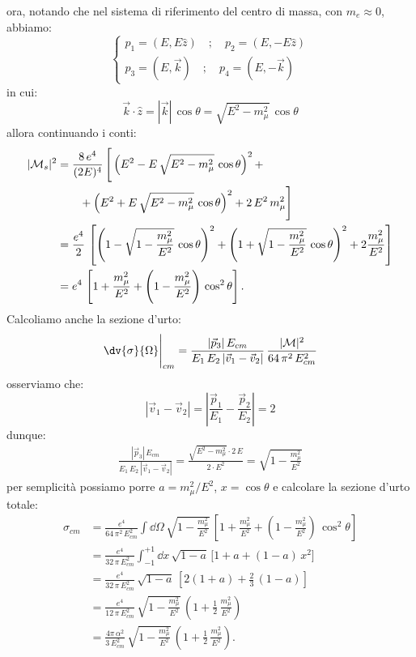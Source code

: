 ora, notando che nel sistema di riferimento del centro di massa, con $m_e\approx 0$, abbiamo:
\begin{equation}
    \begin{cases}
        p_1 = (E,E\hat{z}) \quad ; \quad p_2 = (E,-E\hat{z}) \\
        p_3 = (E,\vec{k}) \quad ; \quad p_4 = (E,-\vec{k})
    \end{cases}
\end{equation}
in cui:
\begin{equation}
    \vec{k}\cdot\hat{z} = |\vec{k}|\, \cos\theta = \sqrt{E^2 - m_\mu^2}\, \cos\theta
\end{equation}
allora continuando i conti:
\begin{align}
    |\mathcal{M}_s|^2 &= \frac{8\, e^4}{(2E)^4}\, \Bigg[ \left( E^2 - E\, \sqrt{E^2 - m_\mu^2}\, \cos\theta \right)^2 + \notag \\
    &\qquad + \left( E^2 + E\, \sqrt{E^2 - m_\mu^2}\, \cos\theta \right)^2 + 2\, E^2\, m_\mu^2 \Bigg] \\
    &= \frac{e^4}{2}\, \left[ \left( 1 - \sqrt{1 - \frac{m_\mu^2}{E^2}}\, \cos\theta \right)^2 + \left( 1 + \sqrt{1 - \frac{m_\mu^2}{E^2}}\, \cos\theta \right)^2 + 2\frac{m_\mu^2}{E^2} \right] \\
    &= e^4\, \left[ 1 + \frac{m_\mu^2}{E^2} + \left(1 - \frac{m_\mu^2}{E^2}\right)\, \cos^2\theta \right].
\end{align}
Calcoliamo anche la sezione d'urto:
\begin{equation}
    \dv{\sigma}{\Omega}\Bigg|_{cm} = \frac{|\vec{p}_3|\, E_{cm}}{E_1\, E_2\, |\vec{v}_1 - \vec{v}_2|}\, \frac{|\mathcal{M}|^2}{64\, \pi^2\, E_{cm}^2}
\end{equation}
osserviamo che:
\begin{equation}
    |\vec{v}_1 - \vec{v}_2| = \left|\frac{\vec{p}_1}{E_1} - \frac{\vec{p}_2}{E_2}\right| = 2
\end{equation}
dunque:
\begin{align}
    \frac{|\vec{p}_3|\, E_{cm}}{E_1\, E_2\, |\vec{v}_1 - \vec{v}_2|} = \frac{\sqrt{E^2 - m_\mu^2}\cdot 2\, E}{2\cdot E^2} = \sqrt{1 - \frac{m_\mu^2}{E^2}}
\end{align}
per semplicità possiamo porre $a=m_\mu^2/E^2$, $x=\cos\theta$ e calcolare la sezione d'urto totale:
\begin{align}
    \sigma_{cm} &= \frac{e^4}{64\, \pi^2\, E_{cm}^2}\int\dd\Omega\, \sqrt{1 - \frac{m_\mu^2}{E^2}}\, \left[ 1 + \frac{m_\mu^2}{E^2} + \left( 1 - \frac{m_\mu^2}{E^2}\right)\, \cos^2\theta \right] \\
    &= \frac{e^4}{32\, \pi\, E_{cm}^2}\int_{-1}^{+1}\dd x\, \sqrt{1 - a}\, \Big[ 1 + a + (1-a)\, x^2 \Big] \\
    &= \frac{e^4}{32\, \pi\, E_{cm}^2}\, \sqrt{1-a}\, \left[ 2(1+a) + \frac{2}{3}\, (1-a) \right] \\
    &= \frac{e^4}{12\, \pi\, E_{cm}^2}\, \sqrt{1 - \frac{m_\mu^2}{E^2}}\, \left(1 + \frac{1}{2}\, \frac{m_\mu^2}{E^2}\right) \\
    &= \frac{4\pi\, \alpha^2}{3\, E_{cm}^2}\, \sqrt{1 - \frac{m_\mu^2}{E^2}}\, \left( 1 + \frac{1}{2}\, \frac{m_\mu^2}{E^2} \right).
\end{align}
